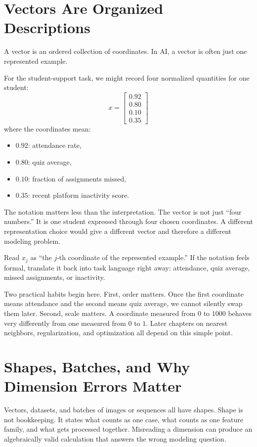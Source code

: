 \section*{Vectors Are Organized Descriptions}

A vector is an ordered collection of coordinates. In AI, a vector is often just one represented example.

For the student-support task, we might record four normalized quantities for one student:
\[
x =
\begin{bmatrix}
0.92 \\
0.80 \\
0.10 \\
0.35
\end{bmatrix}
\]
where the coordinates mean:
\begin{itemize}[leftmargin=*]
\item \(0.92\): attendance rate,
\item \(0.80\): quiz average,
\item \(0.10\): fraction of assignments missed,
\item \(0.35\): recent platform inactivity score.
\end{itemize}

The notation matters less than the interpretation. The vector is not just ``four numbers.'' It is one student expressed through four chosen coordinates. A different representation choice would give a different vector and therefore a different modeling problem.

Read \(x_j\) as ``the \(j\)-th coordinate of the represented example.'' If the notation feels formal, translate it back into task language right away: attendance, quiz average, missed assignments, or inactivity.

Two practical habits begin here. First, order matters. Once the first coordinate means attendance and the second means quiz average, we cannot silently swap them later. Second, scale matters. A coordinate measured from \(0\) to \(1000\) behaves very differently from one measured from \(0\) to \(1\). Later chapters on nearest neighbors, regularization, and optimization all depend on this simple point.

\section*{Shapes, Batches, and Why Dimension Errors Matter}

Vectors, datasets, and batches of images or sequences all have shapes. Shape is not bookkeeping. It states what counts as one case, what counts as one feature family, and what gets processed together. Misreading a dimension can produce an algebraically valid calculation that answers the wrong modeling question.

